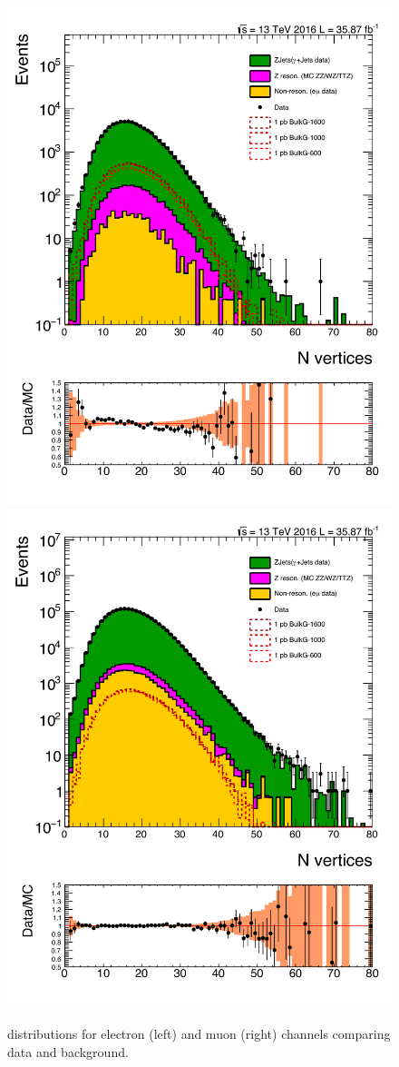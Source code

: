 \begin{figure}[htbp!]
\centering
\includegraphics[width=0.46\linewidth,page=18]{figures/ReMiniSummer16_DT_PhReMiniMCRcFixXsec_GMCPhPtWt_tightzpt50_puWeightsummer16_muoneg_gjet_metfilter_unblind_el_log_1pb.pdf}
\includegraphics[width=0.46\linewidth,page=18]{figures/ReMiniSummer16_DT_PhReMiniMCRcFixXsec_GMCPhPtWt_tightzpt50_puWeightsummer16_muoneg_gjet_metfilter_unblind_mu_log_1pb.pdf}
\caption{\ptmiss distributions for electron (left) and muon (right) channels
comparing data and background.}
\label{fig:gjet_met_narrow}
\end{figure}

